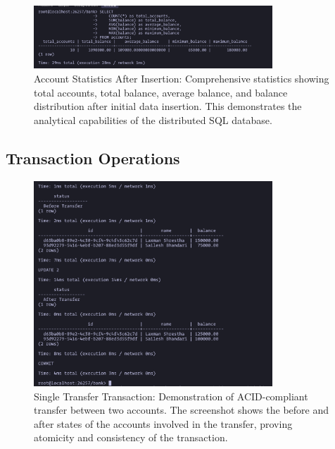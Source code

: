 \begin{figure}[H]
  \centering
  \includegraphics[width=0.8\textwidth]{task-5/screenshots/account-stats.png}
  \caption{Account Statistics After Insertion: Comprehensive statistics showing total accounts, total balance, average balance, and balance distribution after initial data insertion. This demonstrates the analytical capabilities of the distributed SQL database.}
  \label{fig:task5-account-stats}
\end{figure}

\subsection*{Transaction Operations}

\begin{figure}[H]
  \centering
  \includegraphics[width=0.8\textwidth]{task-5/screenshots/single-transfer.png}
  \caption{Single Transfer Transaction: Demonstration of ACID-compliant transfer between two accounts. The screenshot shows the before and after states of the accounts involved in the transfer, proving atomicity and consistency of the transaction.}
  \label{fig:task5-single-transfer}
\end{figure}


